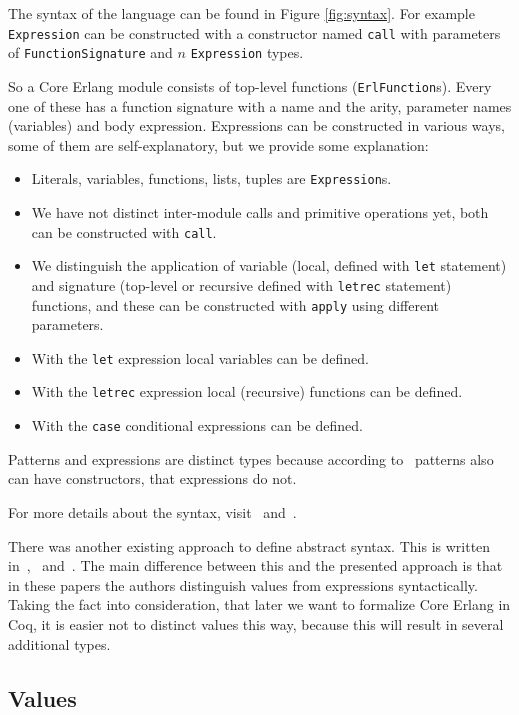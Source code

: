 \documentclass[12pt]{article}
\theoremstyle{definition}
\numberwithin{equation}{section}
\begin{document}
The syntax of the language can be found in Figure \ref{fig:syntax}. For example \verb|Expression| can be constructed with a constructor named \verb|call| with parameters of \verb|FunctionSignature| and $n$ \verb|Expression| types.

So a Core Erlang module consists of top-level functions (\verb|ErlFunction|s). Every one of these has a function signature with a name and the arity, parameter names (variables) and body expression. Expressions can be constructed in various ways, some of them are self-explanatory, but we provide some explanation:

\begin{itemize}
	\item Literals, variables, functions, lists, tuples are \verb|Expression|s.
	\item We have not distinct inter-module calls and primitive operations yet, both can be constructed with \verb|call|.
	\item We distinguish the application of variable (local, defined with \verb|let| statement) and signature (top-level or recursive defined with \verb|letrec| statement) functions, and these can be constructed with \verb|apply| using different parameters.
	\item With the \verb|let| expression local variables can be defined.
	\item With the \verb|letrec| expression local (recursive) functions can be defined.
	\item With the \verb|case| conditional expressions can be defined.
\end{itemize}

Patterns and expressions are distinct types because according to~\cite{carlsson2000core} patterns also can have constructors, that expressions do not.

For more details about the syntax, visit~\cite{carlsson2000core} and~\cite{nishida2016reversible}.

There was another existing approach to define abstract syntax. This is written in~\cite{fredlund2001framework},~\cite{fredlund2003verification} and~\cite{vidal2014towards}. The main difference between this and the presented approach is that in these papers the authors distinguish values from expressions syntactically. Taking the fact into consideration, that later we want to formalize Core Erlang in Coq, it is easier not to distinct values this way, because this will result in several additional types.


\subsection{Values}
\end{document}
